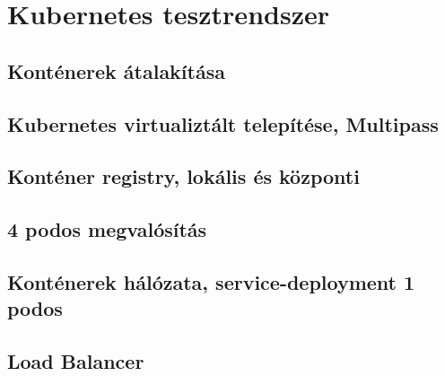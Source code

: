 \chapter{Kubernetes tesztrendszer}

\section{Konténerek átalakítása}

\section{Kubernetes virtualiztált telepítése, Multipass}

\section{Konténer registry, lokális és központi}

\section{4 podos megvalósítás}

\section{Konténerek hálózata, service-deployment 1 podos}

\section{Load Balancer}

